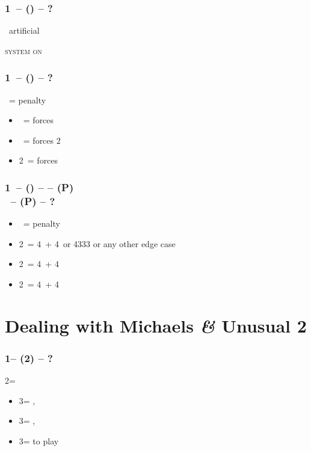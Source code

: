 \subsubsection*{1\ntx\ -- (\alrts{\dbl}) -- ?}
\dbl\ artificial

\textsc{system on}

\subsubsection*{1\ntx\ -- (\dbl) -- ?}
\dbl\ = penalty
\begin{itemize}
    \item \pass\ = forces \rdbl
    \item \rdbl\ = forces 2\clubs
    \item 2\ = forces 
\end{itemize}

\subsubsection*{1\ntx\ -- (\dbl) --  -- (P)\\
                \rdbl\ -- (P) -- ?}
\begin{itemize}
    \item \pass\ = penalty
    \item 2\clubs\ = 4\clubs\ + 4\ or 4333 or any other edge case
    \item 2\diams\ = 4\diams\ + 4\major
    \item 2\hearts\ = 4\hearts\ + 4\spades
\end{itemize}

\section{\texorpdfstring{Dealing with Michaels \textit{\&} Unusual 2\nt}{dealingWithMichaels}}\label{sec:dealingWithMichaels}

\subsubsection*{1\clubs -- (2\nt) -- ?}
2\nt = \minor
\begin{itemize}
    \item 3\clubs = \hearts, \invp
    \item 3\diams = \spades, \invp
    \item 3\major = to play
\end{itemize}

